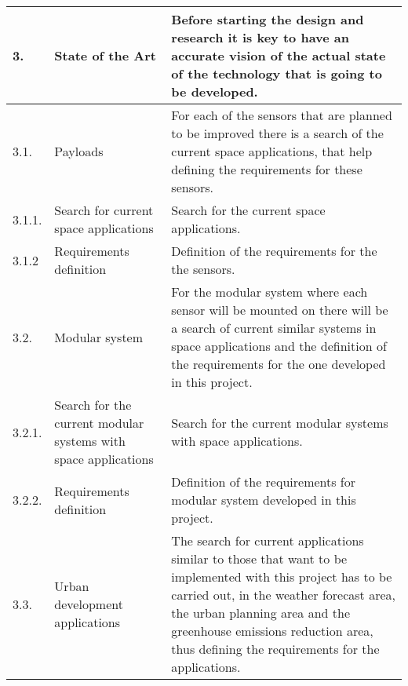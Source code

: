 \begin{longtable}[H]{l >{\raggedright\arraybackslash}p{4cm} p{8cm}}
	\midrule
	
	3. & State of the Art & Before starting the design and research it is key to have an accurate vision of the actual state of the technology that is going to be developed.\vspace{0.2cm} \\
	
	\midrule
	
	3.1. & Payloads & For each of the sensors that are planned to be improved there is a search of the current space applications, that help defining the requirements for these sensors.\vspace{0.2cm} \\
	
	\midrule
	
	3.1.1. & Search for current space applications & Search for the current space applications.\vspace{0.2cm} \\
	
	\midrule
	
	3.1.2 & Requirements definition & Definition of the requirements for the the sensors.\vspace{0.2cm} \\
	
	\midrule
	
	3.2. & Modular system & For the modular system where each sensor will be mounted on there will be a search of current similar systems in space applications and the definition of the requirements for the one developed in this project.\vspace{0.2cm} \\
	
	\midrule
	
	3.2.1. & Search for the current modular systems with space applications & Search for the current modular systems with space applications.\vspace{0.2cm} \\
	
	\midrule
	
	3.2.2. & Requirements definition & Definition of the requirements for modular system developed in this project.\vspace{0.2cm} \\
	
	\midrule
	
	3.3. & Urban development applications & The search for current applications similar to those that want to be implemented with this project has to be carried out, in the weather forecast area, the urban planning area and the greenhouse emissions reduction area, thus defining the requirements for the applications.\vspace{0.2cm} \\
	

\end{longtable}
